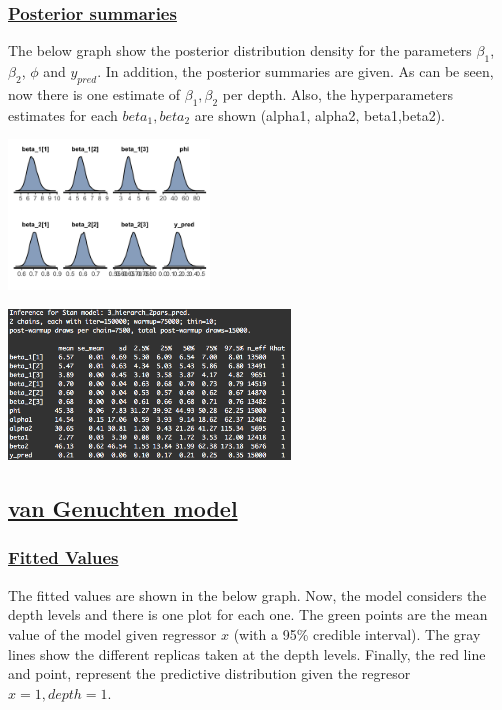 \documentclass{article}
\begin{document}
\subsubsection*{\underline{Posterior summaries}}
The below graph show the posterior distribution density for the parameters $\beta_1$, $\beta_2$, $\phi$ and $y_{pred}$. In addition, the posterior summaries are given. As can be seen, now there is one estimate of $\beta_1,\beta_2$ per depth. Also, the hyperparameters estimates for each $beta_1, beta_2$ are shown (alpha1, alpha2, beta1,beta2).
\begin{minipage}{0.50\textwidth}
\includegraphics[width=\linewidth,height = 4cm]{hier_2pars_dens.png}
\end{minipage}
\begin{minipage}{0.50\textwidth}
\includegraphics[width=\linewidth,height = 4cm]{p05.png}
\end{minipage}


\newpage


\subsection*{\underline{van Genuchten model}}
\subsubsection*{\underline{Fitted Values}}

The fitted values are shown in the below graph. Now, the model considers the depth levels and there is one plot for each one. The green points are the mean value of the model given regressor $x$ (with a 95\% credible interval). The gray lines show the different replicas taken at the depth levels. Finally, the red line and point, represent the predictive distribution given the regresor $x = 1, depth = 1$.
\end{document}
